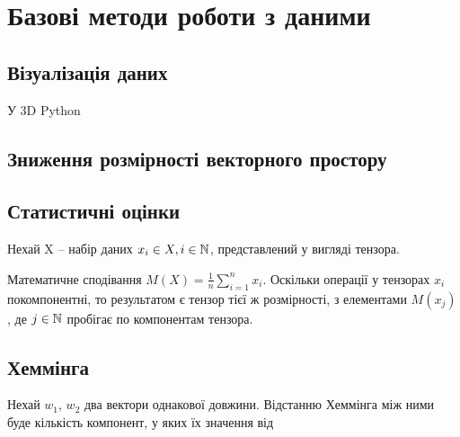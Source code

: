 \section{Базові методи роботи з даними}

\subsection{Візуалізація даних}

У 3D Python 

\subsection{Зниження розмірності векторного простору}

\subsection{Статистичні оцінки}

Нехай X -- набір даних $x_i \in X, i \in \Bbb N$, представлений у вигляді тензора.

\begin{ozn}
 Математичне сподівання $M(X) = \frac{1}{n}\sum_{i = 1}^n x_i$. Оскільки операції у тензорах $x_i$ покомпонентні, то результатом є тензор тієї ж розмірності, з елементами $M(x_j)$, де $j \in \Bbb N$ пробігає по компонентам тензора.
\end{ozn}


\subsection{Хеммінга}

\begin{ozn}
Нехай $w_1$, $w_2$ два вектори однакової довжини. Відстанню Хеммінга між ними буде кількість компонент, у яких їх значення від
\end{ozn}



